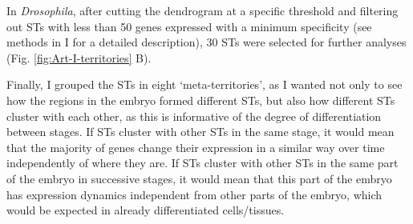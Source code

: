 In \textit{Drosophila}, after cutting the dendrogram at a specific threshold and filtering out STs with less than 50 genes expressed with a minimum specificity (see methods in I for a detailed description), 30 STs were selected for further analyses (Fig. \ref{fig:Art-I-territories} B).

Finally, I grouped the STs in eight `meta-territories', as I wanted not only to see how the regions in the embryo formed different STs, but also how different STs cluster with each other, as this is informative of the degree of differentiation between stages. If STs cluster with other STs in the same stage, it would mean that the majority of genes change their expression in a similar way over time independently of where they are.
If STs cluster with other STs in the same part of the embryo in successive stages, it would mean that this part of the embryo has expression dynamics independent from other parts of the embryo, which would be expected in already differentiated cells/tissues.

